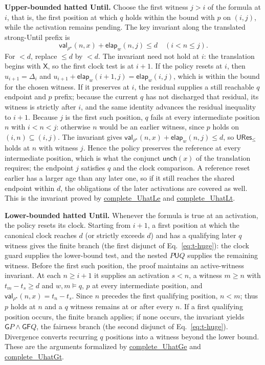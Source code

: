 \documentclass{ieeeaccess}
\newcommand{\Until}{\mathbin{\mathsf{U}}}
\newcommand{\Next}{\mathsf{X}}
\newcommand{\Always}{\mathsf{G}}
\newcommand{\Eventually}{\mathsf{F}}
\newcommand{\Unch}{\mathsf{unch}}
\newcommand{\CVal}{\mathsf{val}}
\newcommand{\elapsed}{\mathsf{elap}}
\newcommand{\runinhead}[1]{\par\noindent\textbf{#1}\enspace}
\newcommand{\Rocqid}[1]{\url{#1}}
\begin{document}
\runinhead{Upper-bounded hatted Until.}
Choose the first witness $j>i$ of the formula at $i$, that is, the first
position at which $q$ holds within the bound with $p$ on $(i,j)$, while
the activation remains pending. The
key invariant along the translated strong-Until prefix is
\begin{equation}
\CVal_{\rho^\star}(n,x)+\elapsed_w(n,j)\le d
\quad(i<n\le j).
\label{eq:canonical-until-invariant}
\end{equation}
For $<d$, replace $\le d$ by $<d$. The invariant need not hold at $i$:
the translation begins with $\Next$, so the first clock test is at $i+1$.
If the policy resets at $i$, then $u_{i+1}=\Delta_i$ and
$u_{i+1}+\elapsed_w(i+1,j)=\elapsed_w(i,j)$, which is within the bound for
the chosen witness. If it preserves at $i$, the residual supplies a still
reachable $q$ endpoint and $p$ prefix; because the current $q$ has not
discharged that residual, its witness is strictly after $i$, and the same
identity advances the residual inequality to $i+1$. Because $j$ is the first such
position, $q$ fails at every intermediate position $n$ with $i<n<j$: otherwise
$n$ would be an earlier witness, since $p$ holds on $(i,n)\subseteq(i,j)$. The
invariant gives $\CVal_{\rho^\star}(n,x)+\elapsed_w(n,j)\le d$, so
$\mathsf{URes}_{\le}$ holds at $n$ with witness $j$. Hence the policy preserves
the reference at every intermediate position, which is what the conjunct
$\Unch(x)$ of the translation requires; the endpoint $j$ satisfies $q$ and the
clock comparison. A reference reset earlier has a larger age than any later
one, so if it still reaches the shared endpoint within $d$, the obligations of
the later activations are covered as well. This is the invariant proved
by \Rocqid{complete_UhatLe} and \Rocqid{complete_UhatLt}.

\runinhead{Lower-bounded hatted Until.}
Whenever the formula is true at an activation, the policy resets its clock.
Starting from $i+1$, a first position at which the canonical clock reaches
$d$ (or strictly exceeds $d$) and has a qualifying later $q$ witness gives
the finite branch (the first disjunct of Eq.~\eqref{eq:t-huge}): the clock guard supplies the lower-bound
test, and the nested $P\Until Q$ supplies the remaining witness. Before the
first such position, the proof maintains an active-witness invariant. At
each $n\ge i+1$ it supplies an activation $s<n$, a witness $m\ge n$ with
$t_m-t_s\ge d$ and $w,m\models q$, $p$ at every intermediate position, and
$\CVal_{\rho^\star}(n,x)=t_n-t_s$. Since $n$ precedes the first qualifying position, $n<m$; thus $p$ holds at
$n$ and a $q$ witness
remains at or after every $n$. If a first qualifying position occurs, the
finite branch applies; if none occurs, the invariant yields
$\Always P\land\Always\Eventually Q$, the fairness branch (the second disjunct of Eq.~\eqref{eq:t-huge}).
Divergence converts recurring $q$ positions into a witness beyond the
lower bound. These are the arguments
formalized by \Rocqid{complete_UhatGe} and \Rocqid{complete_UhatGt}.
\end{document}
